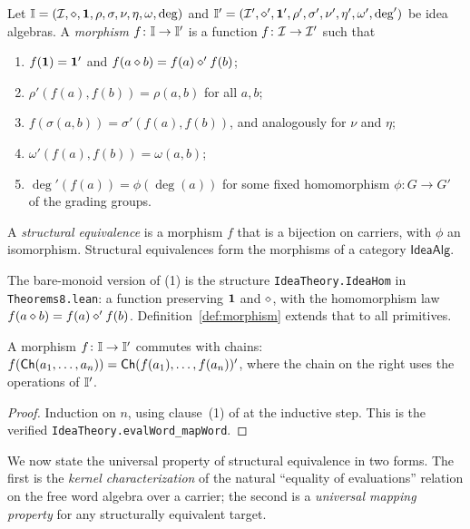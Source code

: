 \begin{definition}\label{def:morphism}
Let $\mathbb{I} = (\mathcal{I},\mathbin{\diamond},\mathbf{1},\rho,\sigma,\nu,\eta,\omega,\deg)$
and $\mathbb{I}' = (\mathcal{I}',\mathbin{\diamond}',\mathbf{1}',\rho',\sigma',\nu',\eta',
\omega',\deg')$ be idea algebras. A \emph{morphism} $f\colon\mathbb{I}\to
\mathbb{I}'$ is a function $f\colon\mathcal{I}\to\mathcal{I}'$ such that
\begin{enumerate}
  \item $f(\mathbf{1}) = \mathbf{1}'$ and $f(a\mathbin{\diamond} b) = f(a)\mathbin{\diamond}' f(b)$;
  \item $\rho'(f(a),f(b)) = \rho(a,b)$ for all $a,b$;
  \item $f(\sigma(a,b))=\sigma'(f(a),f(b))$, and analogously for $\nu$
        and $\eta$;
  \item $\omega'(f(a),f(b)) = \omega(a,b)$;
  \item $\deg'(f(a)) = \phi(\deg(a))$ for some fixed homomorphism
        $\phi\colon G\to G'$ of the grading groups.
\end{enumerate}
A \emph{structural equivalence} is a morphism $f$ that is a bijection
on carriers, with $\phi$ an isomorphism. Structural equivalences form
the morphisms of a category $\mathsf{IdeaAlg}$.
\end{definition}

The bare-monoid version of (1) is the structure
\texttt{IdeaTheory.IdeaHom} in \texttt{Theorems8.lean}: a function
preserving $\mathbf{1}$ and $\mathbin{\diamond}$, with the homomorphism law
$f(a\mathbin{\diamond} b) = f(a)\mathbin{\diamond}' f(b)$. Definition~\ref{def:morphism}
extends that to all primitives.

\begin{lemma}\label{lem:image-chain}
A morphism $f\colon\mathbb{I}\to\mathbb{I}'$ commutes with chains:
$f(\mathsf{Ch}(a_1,\dots,a_n)) = \mathsf{Ch}(f(a_1),\dots,f(a_n))'$, where the
chain on the right uses the operations of $\mathbb{I}'$.
\end{lemma}

\begin{proof}
Induction on $n$, using clause~(1) of  at the
inductive step. This is the verified \texttt{IdeaTheory.evalWord\_mapWord}.
\end{proof}

We now state the universal property of structural equivalence in two
forms. The first is the \emph{kernel characterization} of the natural
``equality of evaluations'' relation on the free word algebra over a
carrier; the second is a \emph{universal mapping property} for any
structurally equivalent target.


